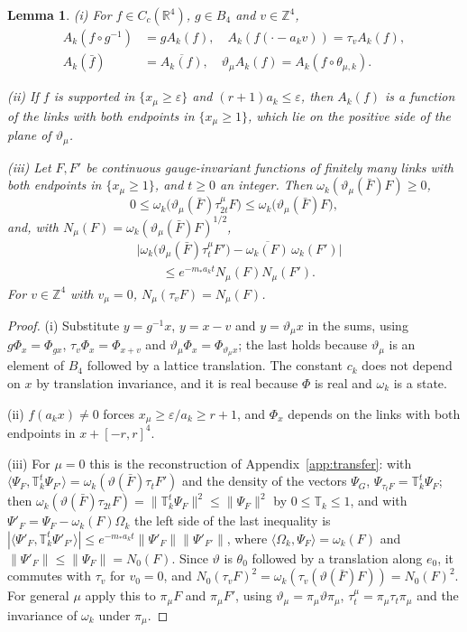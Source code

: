 \documentclass[aps,prd,twocolumn,superscriptaddress,nofootinbib,longbibliography,floatfix,amsmath,amssymb,10pt]{revtex4-2}
\newtheorem{lemma}[theorem]{Lemma}
\theoremstyle{definition}
\theoremstyle{remark}
\newcommand{\R}{\mathbb{R}}
\newcommand{\Z}{\mathbb{Z}}
\newcommand{\ip}[2]{\langle #1,#2\rangle}
\begin{document}
\begin{lemma}\label{lem:limitElattice}
\textup{(i)} For $f\in C_c(\R^4)$, $g\in B_4$ and $v\in\Z^4$,
\[
\begin{split}
A_k(f\circ g^{-1})&=gA_k(f),\quad A_k(f(\cdot-a_kv))=\tau_vA_k(f),\\
A_k(\bar f)&=\overline{A_k(f)},\quad\vartheta_\mu A_k(f)=A_k(f\circ
\theta_{\mu,k}).
\end{split}
\]

\textup{(ii)} If $f$ is supported in $\{x_\mu\ge\varepsilon\}$ and
$(r+1)a_k\le\varepsilon$, then $A_k(f)$ is a function of the links with both
endpoints in $\{x_\mu\ge1\}$, which lie on the positive side of the plane
of $\vartheta_\mu$.

\textup{(iii)} Let $F,F'$ be continuous gauge-invariant functions of
finitely many links with both endpoints in $\{x_\mu\ge1\}$, and $t\ge0$ an
integer. Then $\omega_k(\vartheta_\mu(\bar F)F)\ge0$,
\[
0\le\omega_k\bigl(\vartheta_\mu(\bar F)\tau^\mu_{2t}F\bigr)\le
\omega_k\bigl(\vartheta_\mu(\bar F)F\bigr),
\]
and, with $N_\mu(F)=\omega_k(\vartheta_\mu(\bar F)F)^{1/2}$,
\[
\begin{split}
&\bigl|\omega_k\bigl(\vartheta_\mu(\bar F)\tau^\mu_tF'\bigr)-
\overline{\omega_k(F)}\,\omega_k(F')\bigr|\\
&\qquad\le e^{-m_*a_kt}N_\mu(F)N_\mu(F') .
\end{split}
\]
For $v\in\Z^4$ with $v_\mu=0$, $N_\mu(\tau_vF)=N_\mu(F)$.
\end{lemma}

\begin{proof}
(i) Substitute $y=g^{-1}x$, $y=x-v$ and $y=\vartheta_\mu x$ in the sums,
using $g\Phi_x=\Phi_{gx}$, $\tau_v\Phi_x=\Phi_{x+v}$ and
$\vartheta_\mu\Phi_x=\Phi_{\vartheta_\mu x}$; the last holds because
$\vartheta_\mu$ is an element of $B_4$ followed by a lattice translation.
The constant $c_k$ does not depend on $x$ by translation invariance, and it
is real because $\Phi$ is real and $\omega_k$ is a state.

(ii) $f(a_kx)\ne0$ forces $x_\mu\ge\varepsilon/a_k\ge r+1$, and $\Phi_x$
depends on the links with both endpoints in $x+[-r,r]^4$.

(iii) For $\mu=0$ this is the reconstruction of Appendix~\ref{app:transfer}:
with $\ip{\Psi_F}{\mathbb T_k^t\Psi_{F'}}=\omega_k(\vartheta(\bar F)\tau_tF')$
and the density of the vectors $\Psi_G$, $\Psi_{\tau_tF}=\mathbb T_k^t
\Psi_F$; then $\omega_k(\vartheta(\bar F)\tau_{2t}F)=\|\mathbb T_k^t\Psi_F
\|^2\le\|\Psi_F\|^2$ by $0\le\mathbb T_k\le1$, and with $\Psi'_F=\Psi_F-
\omega_k(F)\Omega_k$ the left side of the last inequality is $|\ip{\Psi'_F}
{\mathbb T_k^t\Psi'_{F'}}|\le e^{-m_*a_kt}\|\Psi'_F\|\|\Psi'_{F'}\|$, where
$\ip{\Omega_k}{\Psi_F}=\omega_k(F)$ and $\|\Psi'_F\|\le\|\Psi_F\|=N_0(F)$.
Since $\vartheta$ is $\theta_0$ followed by a translation along $e_0$, it
commutes with $\tau_v$ for $v_0=0$, and $N_0(\tau_vF)^2=\omega_k(\tau_v(
\vartheta(\bar F)F))=N_0(F)^2$. For general $\mu$ apply this to $\pi_\mu F$
and $\pi_\mu F'$, using $\vartheta_\mu=\pi_\mu\vartheta\pi_\mu$,
$\tau^\mu_t=\pi_\mu\tau_t\pi_\mu$ and the invariance of $\omega_k$ under
$\pi_\mu$.
\end{proof}
\end{document}
